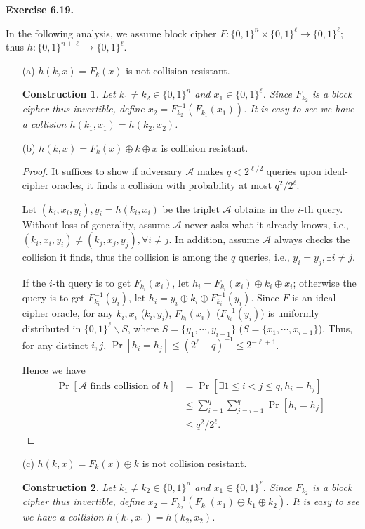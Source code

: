 \documentclass[a4paper]{article}
\newtheorem{construction}{Construction}
\newtheorem*{proof}{Proof}
\newenvironment{exercise}[1]{
	\par
	\noindent\textbf{Exercise #1.}\quad
}{
	\par
	\bigskip
}
\newcommand{\sbra}[1]{\left[ #1 \right]}
\newcommand{\bin}{\{0,1\}}
\newcommand{\Acal}{\mathcal{A}}
\begin{document}
\begin{exercise}{6.19}
In the following analysis, we assume block cipher $F:\bin^n\times\bin^\ell\to\bin^\ell$;
thus $h:\bin^{n+\ell}\to\bin^\ell$.
\begin{itemize}
    \item[(a)] $h(k,x)=F_k(x)$ is not collision resistant.
        \begin{construction}
            Let $k_1\neq k_2\in\bin^n$ and $x_1\in\bin^\ell$.
            Since $F_{k_2}$ is a block cipher thus invertible, define $x_2=F_{k_2}^{-1}(F_{k_1}(x_1))$.
            It is easy to see we have a collision $h(k_1,x_1)=h(k_2,x_2)$.
        \end{construction}
    \item[(b)] $h(k,x)=F_k(x)\oplus k\oplus x$ is collision resistant.
        \begin{proof}
            It suffices to show if adversary $\Acal$ makes $q<2^{\ell/2}$ queries upon ideal-cipher oracles,
            it finds a collision with probability at most $q^2/2^\ell$.
            
            Let $(k_i,x_i,y_i),y_i=h(k_i,x_i)$ be the triplet $\Acal$ obtains in the $i$-th query.
            Without loss of generality, assume $\Acal$ never asks what it already knows, i.e., 
            $(k_i,x_i,y_i)\neq(k_j,x_j,y_j),\forall i\neq j$. In addition, assume $\Acal$ always checks the collision 
            it finds, thus the collision is among the $q$ queries, i.e., $y_i=y_j,\exists i\neq j$.

            If the $i$-th query is to get $F_{k_i}(x_i)$, let $h_i=F_{k_i}(x_i)\oplus k_i\oplus x_i$;
            otherwise the query is to get $F_{k_i}^{-1}(y_i)$, let $h_i=y_i\oplus k_i\oplus F_{k_i}^{-1}(y_i)$.
            Since $F$ is an ideal-cipher oracle, for any $k_i,x_i$ ($k_i,y_i$), $F_{k_i}(x_i)$ ($F^{-1}_{k_i}(y_i)$)
            is uniformly distributed in $\bin^\ell\backslash S$, where $S=\{y_1,\cdots,y_{i-1}\}$ 
            ($S=\{x_1,\cdots,x_{i-1}\}$). Thus, for any distinct $i,j$, $\Pr\sbra{h_i=h_j}\leq(2^\ell-q)^{-1}\leq 2^{-\ell+1}$.

            Hence we have
            \begin{align*}
                \Pr\sbra{\text{$\Acal$ finds collision of $h$}}&=\Pr\sbra{\exists 1\leq i<j\leq q,h_i=h_j}\\
                &\leq\sum_{i=1}^q\sum_{j=i+1}^q\Pr\sbra{h_i=h_j}\\
                &\leq q^2/2^\ell.
            \end{align*}
        \end{proof}
    \item[(c)] $h(k,x)=F_k(x)\oplus k$ is not collision resistant.
        \begin{construction}
            Let $k_1\neq k_2\in\bin^n$ and $x_1\in\bin^\ell$.
            Since $F_{k_2}$ is a block cipher thus invertible, define $x_2=F_{k_2}^{-1}(F_{k_1}(x_1)\oplus k_1\oplus k_2)$.
            It is easy to see we have a collision $h(k_1,x_1)=h(k_2,x_2)$.
        \end{construction}
\end{itemize}
\end{exercise}
\end{document}
